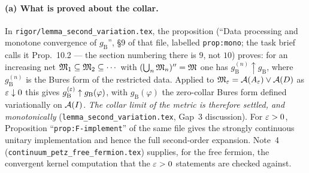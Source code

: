 \documentclass[11pt]{article}
\newcommand{\gB}{g_{\mathrm B}}
\begin{document}
\paragraph{(a) What is proved about the collar.}
In \texttt{rigor/lemma\_second\_variation.tex}, the proposition
(``Data processing and monotone convergence of $\gB$'', \S9 of that file, labelled
\texttt{prop:mono}; the task brief calls it Prop.~10.2 --- the section numbering there is $9$, not $10$)
proves: for an increasing net $\mathfrak M_1\subseteq\mathfrak M_2\subseteq\cdots$ with
$(\bigcup_n\mathfrak M_n)''=\mathfrak M$ one has $\gB^{(n)}\uparrow\gB$, where $\gB^{(n)}$ is the Bures form of the
restricted data.  Applied to $\mathfrak M_\varepsilon=\mathcal A(A_\varepsilon)\vee\mathcal A(D)$ as $\varepsilon\downarrow0$ this gives
$\gB^{(\eps)}\uparrow\gB(\varphi)$, with $\gB(\varphi)$ the zero-collar Bures form defined
variationally on $\mathcal A(I)$.  \emph{The collar limit of the metric is therefore settled, and
monotonically} (\texttt{lemma\_second\_variation.tex}, Gap~3 discussion).  For $\varepsilon>0$,
Proposition ``\texttt{prop:F-implement}'' of the same file gives the strongly continuous unitary
implementation and hence the full second-order expansion.  Note~4
(\texttt{continuum\_petz\_free\_fermion.tex}) supplies, for the free fermion, the convergent kernel
computation that the $\varepsilon>0$ statements are checked against.
\end{document}
